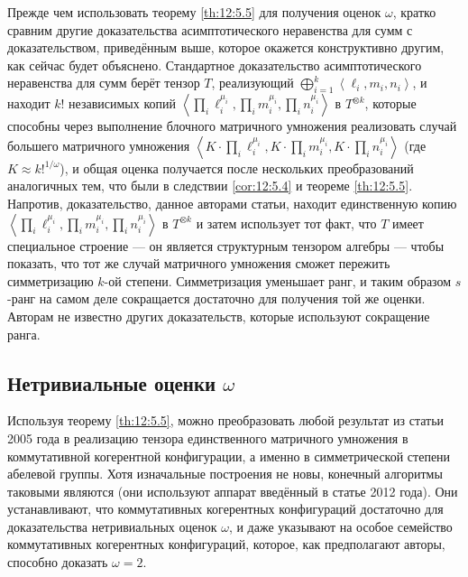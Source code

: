 Прежде чем использовать теорему \ref{th:12:5.5} для получения оценок $\omega$, кратко сравним другие доказательства асимптотического неравенства для сумм с доказательством, приведённым выше, которое окажется конструктивно другим, как сейчас будет объяснено. Стандартное доказательство асимптотического неравенства для сумм берёт тензор $T$, реализующий $\bigoplus_{i=1}^k \left\langle \ell_i, m_i, n_i  \right\rangle$, и находит $k!$ независимых копий $\left\langle \prod_i \ell_i^{\mu_i},  \prod_i m_i^{\mu_i}, \prod_i n_i^{\mu_i}\right\rangle$ в $T^{\otimes k}$, которые способны через выполнение блочного матричного умножения реализовать случай большего матричного умножения $\left\langle K \cdot \prod_i \ell_i^{\mu_i}, K \cdot \prod_i m_i^{\mu_i}, K \cdot \prod_i n_i^{\mu_i}\right\rangle$ (где $K \approx k!^{1/\omega}$), и общая оценка получается после нескольких преобразований аналогичных тем, что были в следствии \ref{cor:12:5.4} и теореме \ref{th:12:5.5}. Напротив, доказательство, данное авторами статьи, находит единственную копию $\left\langle \prod_i \ell_i^{\mu_i},  \prod_i m_i^{\mu_i}, \prod_i n_i^{\mu_i}\right\rangle$ в $T^{\otimes k}$ и затем использует тот факт, что $T$ имеет специальное строение --- он является структурным тензором алгебры --- чтобы показать, что тот же случай матричного умножения сможет пережить симметризацию $k$-ой степени. Симметризация уменьшает ранг, и таким образом $s$-ранг на самом деле сокращается достаточно для получения той же оценки. Авторам не известно других доказательств, которые используют сокращение ранга.

\subsection{Нетривиальные оценки $\omega$}

Используя теорему \ref{th:12:5.5}, можно преобразовать любой результат из статьи 2005 года в реализацию тензора единственного матричного умножения в коммутативной когерентной конфигурации, а именно в симметрической степени абелевой группы. Хотя изначальные построения не новы, конечный алгоритмы таковыми являются (они используют аппарат введённый в статье 2012 года). Они устанавливают, что коммутативных когерентных конфигураций достаточно для доказательства нетривиальных оценок $\omega$, и даже указывают на особое семейство коммутативных когерентных конфигураций, которое, как предполагают авторы, способно доказать $\omega=2$.

